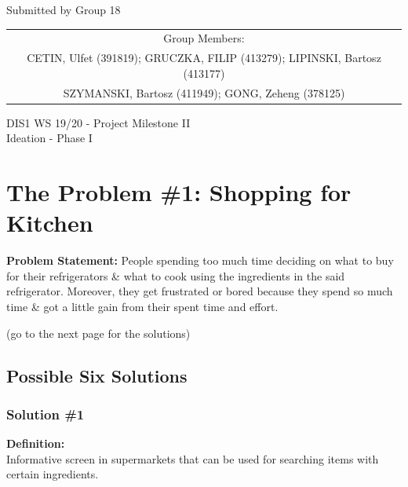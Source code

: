\documentclass[a4paper,10pt,oneside]{scrreprt}
\begin{document}
\begin{center}
	Submitted by Group 18

	\bigskip

	\begin{tabular}{c}
	Group Members: \\
	CETIN, Ulfet (391819); GRUCZKA, FILIP (413279);	LIPINSKI, Bartosz (413177) \\
	SZYMANSKI, Bartosz (411949); GONG, Zeheng (378125)\\
	\end{tabular}

	\bigskip

	DIS1 WS 19/20 - Project Milestone II\\
	Ideation - Phase I\\

\end{center}
\vspace{-1cm}

\begingroup
\let\clearpage\relax
	\chapter{The Problem \#1: Shopping for Kitchen}
\endgroup
				\vspace{-0.5cm}
				\textbf{Problem Statement:} People spending too much time deciding on what to buy for their refrigerators \& what to cook using the ingredients in the said refrigerator. Moreover, they get frustrated or bored because they spend so much time \& got a little gain from their spent time and effort.\\

				\vspace{2cm}
				\begin{center}
					\centering
					(go to the next page for the solutions)
				\end{center}


	\clearpage

	\section{Possible Six Solutions}

		\subsection{Solution \#1}

			\textbf{Definition:}\\
			\indent Informative screen in supermarkets that can be used for searching items with certain ingredients.\\
\end{document}
